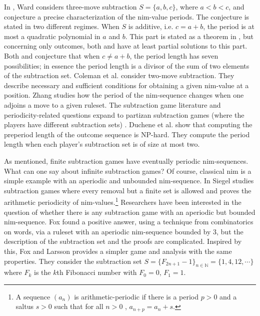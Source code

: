 \documentclass{amsart}
\theoremstyle{plain}
\theoremstyle{definition}
\newcommand{\n}{\mathbb N}
\begin{document}
In  \cite{ward2016conjecture}, Ward considers {\sc three-move subtraction} $S=\{a,b,c\}$, where $a<b<c$, and conjecture a precise characterization of the nim-value periods. The conjecture is stated in two different regimes. When $S$ is additive, i.e. $c= a+b$, the period is at most a quadratic polynomial in  $a$ and $b$. This part is stated as a theorem in \cite{Flammenkamp_1997}, but concerning only outcomes, both \cite{austin1976impartial} and \cite{berlekamp2004winning} have at least partial solutions to this part. Both \cite{Flammenkamp_1997} and \cite{ward2016conjecture} conjecture that when $c \neq a+b$, the period length has seven possibilities; in essence the period length is a divisor of the sum of two elements of the subtraction set. 
Coleman et al.  \cite{coleman2020department} consider {\sc two-move subtraction}. They describe necessary and sufficient conditions for obtaining a given nim-value at a position. %
Zhang  \cite{zhang2021linearity} studies how the period of the nim-sequence changes when one adjoins a move to a given ruleset. The subtraction game literature and periodicity-related questions expand to partizan subtraction games (where the players have different subtraction sets) \cite{fraenkel1987partizan}. Duchene et al. \cite{duchene2022partizan} show that computing the preperiod length of the outcome sequence is NP-hard.  They compute the period length when each player's subtraction set is of size at most two.  








As mentioned, finite subtraction games have eventually periodic nim-sequences. What can one say about infinite subtraction games? Of course, classical {\sc nim} is a simple example with an aperiodic and unbounded nim-sequence. In \cite{siegel2005finite} Siegel studies subtraction games where every removal but a finite set is allowed and proves the arithmetic periodicity of nim-values.\footnote{A sequence $(a_n)$ is arithmetic-periodic if there is a period $p>0$ and a saltus $s > 0$ such that for all $n > 0$ , $a_{n + p} = a_n + s$.}  Researchers have been interested in the question of whether there is any subtraction game with an aperiodic but bounded nim-sequence. Fox \cite{fox2014aperiodic} found a positive answer,  using a technique from combinatorics on words,  via a ruleset with an aperiodic nim-sequence bounded by 3, but the  description of the subtraction set and the proofs are complicated. Inspired by this, Fox and Larsson \cite{FoxLar} provides a simpler game and analysis with the same properties. They consider the subtraction set $S= \{ F_{2n+1} -1 \}_{n\in\n} =\{1,4,12, \cdots \}$ where $F_k$
is the $k$th Fibonacci number with $F_0=0$, $F_1 =1$.
\end{document}
